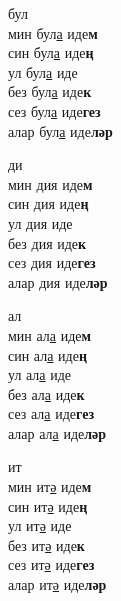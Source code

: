 \begin{multicols}{4}
\begin{enumerate}
\begin{minipage}{\linewidth}
    \item
    бул\\
    мин бул\underline{а} иде\textbf{м}\\
    син бул\underline{а} иде\textbf{ң}\\
    ул бул\underline{а} иде\\
    без бул\underline{а} иде\textbf{к}\\
    сез бул\underline{а} иде\textbf{гез}\\
    алар бул\underline{а} иде\textbf{ләр}\\
\end{minipage}

\begin{minipage}{\linewidth}
    \item
    ди\\
    мин дия иде\textbf{м}\\
    син дия иде\textbf{ң}\\
    ул дия иде\\
    без дия иде\textbf{к}\\
    сез дия иде\textbf{гез}\\
    алар дия иде\textbf{ләр}\\
\end{minipage}

\begin{minipage}{\linewidth}
    \item
    ал\\
    мин ал\underline{а} иде\textbf{м}\\
    син ал\underline{а} иде\textbf{ң}\\
    ул ал\underline{а} иде\\
    без ал\underline{а} иде\textbf{к}\\
    сез ал\underline{а} иде\textbf{гез}\\
    алар ал\underline{а} иде\textbf{ләр}\\
\end{minipage}

\begin{minipage}{\linewidth}
    \item
    ит\\
    мин ит\underline{ә} иде\textbf{м}\\
    син ит\underline{ә} иде\textbf{ң}\\
    ул ит\underline{ә} иде\\
    без ит\underline{ә} иде\textbf{к}\\
    сез ит\underline{ә} иде\textbf{гез}\\
    алар ит\underline{ә} иде\textbf{ләр}\\
\end{minipage}


\end{enumerate}
\end{multicols}
